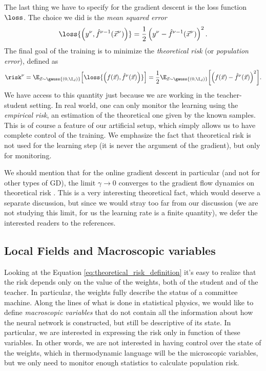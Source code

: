 The last thing we have to specify for the gradient descent is the loss function \(\loss\).
The choice we did is the \emph{mean squared error}
\[
  \loss{\left(y^\nu,\hat{f}^{\nu-1}{\left(\vec{x}^\nu\right)}\right)} = \frac{1}{2}\left(y^\nu-\hat{f}^{\nu-1}{\left(\vec{x}^\nu\right)}\right)^2.
\]
The final goal of the training is to minimize the \emph{theoretical risk}
(or \emph{population error}), defined as
\begin{equation} \label{eq:theoretical_risk_definition}
  \risk^{\nu} = \E_{\vec{x}\sim\gauss{(0,\I_d)}}{
  \left[\loss{\left(f{\left(\vec{x}\right)},\hat{f}^\nu{\left(\vec{x}\right)}\right)}\right]}=
  \frac{1}{2}\E_{\vec{x}\sim\gauss{(0,\I_d)}}{\left[\left(f{\left(\vec{x}\right)}-\hat{f}^{\nu}{\left(\vec{x}\right)}\right)^2\right]}.
\end{equation}
We have access to this quantity just because we are working in the teacher-student setting.
In real world, one can only monitor the learning using the \emph{empirical risk}, an estimation
of the theoretical one given by the known samples.
This is of course a feature of our artificial setup,
which simply allows us to have complete control of the training.
We emphasize the fact that theoretical risk is not used for the learning step
(it is never the argument of the gradient), but only for monitoring.

We should mention that for the online gradient descent in particular (and not for other types of GD),
the limit \(\gamma\to0\) converges to the gradient flow dynamics on theoretical risk \cite{chizat2019lazy}.
This is a very interesting theoretical fact, which would deserve a separate discussion,
but since we would stray too far from our discussion (we are not studying this limit,
for us the learning rate is a finite quantity), we defer the interested readers to the references.




\subsection{Local Fields and Macroscopic variables}
Looking at the Equation \eqref{eq:theoretical_risk_definition} it's easy to realize
that the risk depends only on the value of the weights, both of the student and of the
teacher. In particular, the weights fully describe the status of a committee machine.
Along the lines of what is done in statistical physics, we would like to define \emph{macroscopic variables}
that do not contain all the information about how the neural network is constructed,
but still be descriptive of its state. In particular, we are interested in expressing
the risk only in function of these variables.
In other words, we are not interested in having control over the state of the weights,
which in thermodynamic language will be the microscopic variables,
but we only need to monitor enough statistics to calculate population risk.

